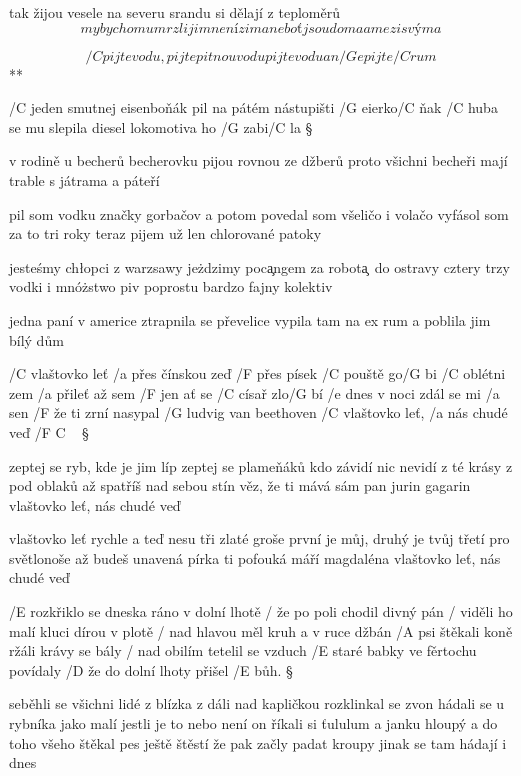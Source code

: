 tak žijou vesele na severu
srandu si dělají z teploměrů
\[ my bychom umrzli jim není zima
neboť jsou doma a mezi svýma \]




\R \[ /C pijte vodu, pijte pitnou vodu
   pijte vodu a n/G epijte /C rum \]**

/C jeden smutnej eisenboňák
pil na pátém nástupišti /G eierko/C ňak
/C huba se mu slepila
diesel lokomotiva ho /G zabi/C la \S

v rodině u becherů
becherovku pijou rovnou ze džberů
proto všichni becheři
mají trable s játrama a páteří \s

pil som vodku značky gorbačov
a potom povedal som všeličo i volačo
vyfásol som za to tri roky
teraz pijem už len chlorované patoky \s

jeste\' smy ch\l opci z warzsawy
je\. zdzimy poc\c angem za robot\c a\ do ostravy
cztery trzy vodki i mnó\. zstwo piv
poprostu bardzo fajny kolektiv \s

jedna paní v americe
ztrapnila se převelice
vypila tam na ex rum
a poblila jim bílý dům




/C vlaštovko leť /a přes čínskou zeď
/F přes písek /C pouště go/G bi
/C oblétni zem /a přileť až sem
/F jen ať se /C císař zlo/G bí
/e dnes v noci zdál se mi /a sen
/F že ti zrní nasypal /G ludvig van beethoven
/C vlaštovko leť, /a nás chudé veď /{F C} {\ } \S

zeptej se ryb, kde je jim líp
zeptej se plameňáků
kdo závidí nic nevidí
z té krásy z pod oblaků
až spatříš nad sebou stín
věz, že ti mává sám pan jurin gagarin
vlaštovko leť, nás chudé veď \s

vlaštovko leť rychle a teď
nesu tři zlaté groše
první je můj, druhý je tvůj
třetí pro světlonoše
až budeš unavená
pírka ti pofouká máří magdaléna
vlaštovko leť, nás chudé veď \s




/E rozkřiklo se dneska ráno v dolní lhotě
/ že po poli chodil divný pán
/ viděli ho malí kluci dírou v plotě
/ nad hlavou měl kruh a v ruce džbán
/A psi štěkali koně ržáli krávy se bály
/ nad obilím tetelil se vzduch
/E staré babky ve fěrtochu povídaly
/D že do dolní lhoty přišel /E bůh. \S

seběhli se všichni lidé z blízka z dáli
nad kapličkou rozklinkal se zvon
hádali se u rybníka jako malí
jestli je to nebo není on
říkali si ťululum a janku hloupý
a do toho všeho štěkal pes
ještě štěstí že pak začly padat kroupy
jinak se tam hádají i dnes \s

